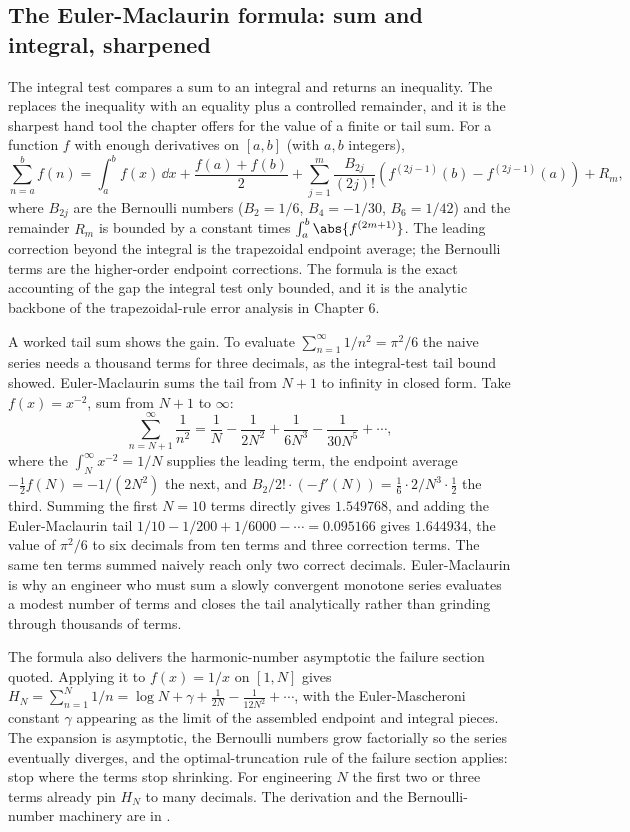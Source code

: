 \subsection{The Euler-Maclaurin formula: sum and integral, sharpened}

The integral test compares a sum to an integral and returns an
inequality. The  replaces the
inequality with an equality plus a controlled remainder, and it is the
sharpest hand tool the chapter offers for the value of a finite or
tail sum. For a function $f$ with enough derivatives on $[a, b]$ (with
$a, b$ integers),
\[
\sum_{n=a}^{b} f(n) = \int_{a}^{b} f(x)\,\dd x + \frac{f(a) + f(b)}{2}
+ \sum_{j=1}^{m} \frac{B_{2j}}{(2j)!}\left(f^{(2j-1)}(b) -
f^{(2j-1)}(a)\right) + R_{m},
\]
where $B_{2j}$ are the Bernoulli numbers ($B_{2} = 1/6$, $B_{4} =
-1/30$, $B_{6} = 1/42$) and the remainder $R_{m}$ is bounded by a
constant times $\int_{a}^{b}\abs{f^{(2m+1)}}$. The leading correction
beyond the integral is the trapezoidal endpoint average; the Bernoulli
terms are the higher-order endpoint corrections. The formula is the
exact accounting of the gap the integral test only bounded, and it is
the analytic backbone of the trapezoidal-rule error analysis in
Chapter 6.

A worked tail sum shows the gain. To evaluate $\sum_{n=1}^{\infty}
1/n^{2} = \pi^{2}/6$ the naive series needs a thousand terms for three
decimals, as the integral-test tail bound showed. Euler-Maclaurin sums
the tail from $N+1$ to infinity in closed form. Take $f(x) = x^{-2}$,
sum from $N+1$ to $\infty$:
\[
\sum_{n=N+1}^{\infty} \frac{1}{n^{2}} = \frac{1}{N} - \frac{1}{2N^{2}}
+ \frac{1}{6N^{3}} - \frac{1}{30 N^{5}} + \cdots,
\]
where the $\int_{N}^{\infty} x^{-2} = 1/N$ supplies the leading term,
the endpoint average $-\tfrac{1}{2}f(N) = -1/(2N^{2})$ the next, and
$B_{2}/2!\cdot(-f'(N)) = \tfrac{1}{6}\cdot 2/N^{3}\cdot\tfrac{1}{2}$ the
third. Summing the first $N = 10$ terms directly gives $1.549768$, and
adding the Euler-Maclaurin tail $1/10 - 1/200 + 1/6000 - \cdots =
0.095166$ gives $1.644934$, the value of $\pi^{2}/6$ to six decimals
from ten terms and three correction terms. The same ten terms summed
naively reach only two correct decimals. Euler-Maclaurin is why an
engineer who must sum a slowly convergent monotone series evaluates a
modest number of terms and closes the tail analytically rather than
grinding through thousands of terms.

The formula also delivers the harmonic-number asymptotic the failure
section quoted. Applying it to $f(x) = 1/x$ on $[1, N]$ gives $H_{N} =
\sum_{n=1}^{N} 1/n = \log N + \gamma + \frac{1}{2N} - \frac{1}{12 N^{2}}
+ \cdots$, with the Euler-Mascheroni constant $\gamma$ appearing as the
limit of the assembled endpoint and integral pieces. The expansion is
asymptotic, the Bernoulli numbers grow factorially so the series
eventually diverges, and the optimal-truncation rule of the failure
section applies: stop where the terms stop shrinking. For engineering
$N$ the first two or three terms already pin $H_{N}$ to many decimals.
The derivation and the Bernoulli-number machinery are in
\cite{text:v2ch17-graham-knuth-patashnik,text:v2ch04-bender-orszag-1999}.

